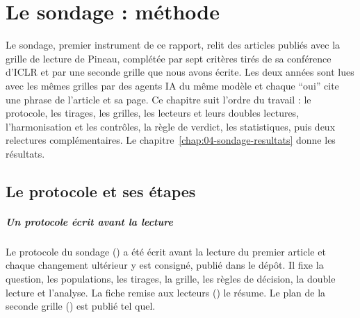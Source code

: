 \chapter{Le sondage : méthode}\label{chap:03-sondage-methode}

Le sondage, premier instrument de ce rapport, relit des articles publiés avec la grille de lecture de
Pineau, complétée par sept critères tirés de sa conférence d'ICLR et par une seconde grille que nous
avons écrite. Les deux années sont lues avec les mêmes grilles par des agents IA du même modèle et
chaque \enquote{oui} cite une phrase de l'article et sa page. Ce chapitre suit l'ordre du travail : le
protocole, les tirages, les grilles, les lecteurs et leurs doubles lectures, l'harmonisation et les
contrôles, la règle de verdict, les statistiques, puis deux relectures complémentaires. Le chapitre~\ref{chap:04-sondage-resultats} donne les résultats.

\section{Le protocole et ses étapes}\label{sec:sm-protocole}

\paragraph{Un protocole écrit avant la lecture}
Le protocole du sondage () a été écrit avant la lecture du premier article
et chaque changement ultérieur y est consigné, publié dans le dépôt. Il fixe la question, les
populations, les tirages, la grille, les règles de décision, la double lecture et l'analyse. La fiche
remise aux lecteurs () le résume. Le plan de la seconde grille
() est publié tel quel.

